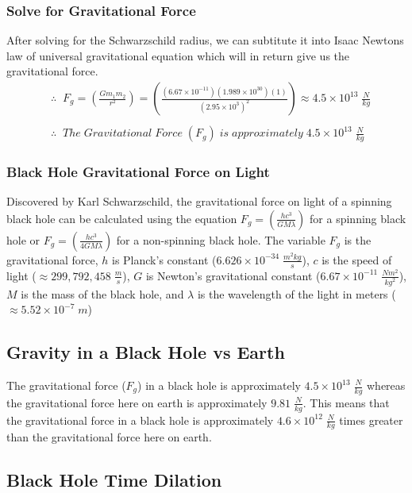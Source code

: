 \documentclass{article}
\begin{document}
\subsubsection{Solve for Gravitational Force}
After solving for the Schwarzschild radius, we can subtitute it into Isaac Newtons law of universal gravitational equation which will in return give us the gravitational force.
\begin{align*}
     & \therefore\;\; F_g = \left(\frac{Gm_1m_2}{r^2}\right) = \left(\frac{(6.67 \times 10^{-11})(1.989\times 10^{30})(1)}{{(2.95 \times 10^{3})}^2}\right) \approx 4.5 \times 10^{13} \;\frac{N}{kg} \\\\
     & \therefore\;\; The\; Gravitational\; Force\; (F_g)\; is\; approximately\; 4.5 \times 10^{13} \;\frac{N}{kg}
\end{align*}

\subsubsection{Black Hole Gravitational Force on Light}
Discovered by Karl Schwarzschild, the gravitational force on light of a spinning black hole can be calculated using the equation $F_g = \left(\frac{hc^3}{GM\lambda}\right)$ for a spinning black hole or $F_g = \left(\frac{hc^3}{4GM\lambda}\right)$ for a non-spinning black hole. The variable $F_g$ is the gravitational force, $h$ is Planck's constant (\hyperref[sec:constants]{$6.626 \times 10^{-34}\;\frac{m^2kg}{s}$}), $c$ is the speed of light (\hyperref[sec:constants]{$\approx 299, 792, 458\;\frac{m}{s}$}), $G$ is Newton's gravitational constant (\hyperref[sec:constants]{$6.67 \times 10^{-11}\;\frac{Nm^2}{kg^2}$}), $M$ is the mass of the black hole, and $\lambda$ is the wavelength of the light in meters ($\approx 5.52\times 10^{-7}\; m$)

\subsection{Gravity in a Black Hole vs Earth}
The gravitational force ($F_g$) in a black hole is approximately $4.5 \times 10^{13}\; \frac{N}{kg}$ whereas the gravitational force here on earth is approximately $9.81\; \frac{N}{kg}$. This means that the gravitational force in a black hole is approximately $4.6 \times 10^{12}\; \frac{N}{kg}$ times greater than the gravitational force here on earth.

\subsection{Black Hole Time Dilation}
\end{document}
